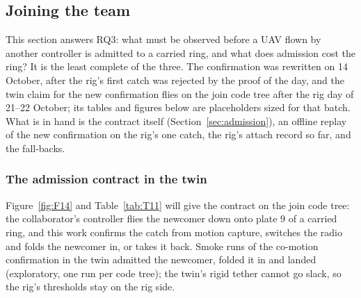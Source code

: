 
\subsection{Joining the team}
\label{sec:res_join}

This section answers RQ3: what must be observed before a UAV flown by another controller is admitted to a carried
ring, and what does admission cost the ring? It is the least complete of the three. The confirmation was rewritten on
14 October, after the rig's first catch was rejected by the proof of the day, and the twin claim for the new
confirmation flies on the join code tree after the rig day of 21--22 October; its tables and figures below are
placeholders sized for that batch. What is in hand is the contract itself (Section~\ref{sec:admission}), an offline
replay of the new confirmation on the rig's one catch, the rig's attach record so far, and the fall-backs.

\subsubsection{The admission contract in the twin}
\label{sec:res_contract}

Figure~\ref{fig:F14} and Table~\ref{tab:T11} will give the contract on the join code tree: the collaborator's
controller flies the newcomer down onto plate 9 of a carried ring, and this work confirms the catch from motion
capture, switches the radio and folds the newcomer in, or takes it back. Smoke runs of the co-motion confirmation in
the twin admitted the newcomer, folded it in and landed (exploratory, one run per code tree); the twin's rigid tether
cannot go slack, so the rig's thresholds stay on the rig side.

